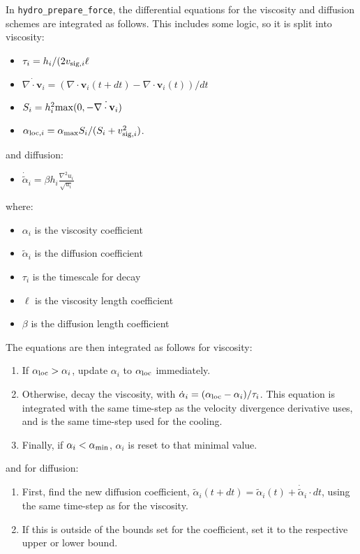 In {\tt hydro\_prepare\_force}, the differential equations for the viscosity and
diffusion schemes are integrated as follows. This includes some logic, so it is
split into viscosity:
\begin{itemize}
	\item $\tau_i = h_i / (2 v_{{\rm sig}, i} \ell$
	\item $\dot{\nabla \cdot \mathbf{v}_i} =
	       \left({\nabla \cdot \mathbf{v}_i}(t+dt) - {\nabla \cdot \mathbf{v}_i}(t)\right)
	       / dt$
	\item $S_i = h_i^2 {\rm max}(0, -\dot{\nabla \cdot \mathbf{v}_i})$
	\item $\alpha_{{\rm loc}, i} = \alpha_{\rm max} S_i / (S_i + v_{{\rm sig}, i}^2)$.
\end{itemize}
and diffusion:
\begin{itemize}
	\item $\dot{\tilde{\alpha}}_i = \beta h_i \frac{\nabla^2 u_i}{\sqrt{u_i}}$
\end{itemize}
where:
\begin{itemize}
	\item $\alpha_i$ is the viscosity coefficient
	\item $\tilde{\alpha}_i$ is the diffusion coefficient
	\item $\tau_i$ is the timescale for decay
	\item $\ell$ is the viscosity length coefficient
	\item $\beta$ is the diffusion length coefficient
\end{itemize}
The equations are then integrated as follows for viscosity:
\begin{enumerate}
	\item If $\alpha_{\rm loc} > \alpha_i$, update $\alpha_i$ to $\alpha_{\rm loc}$
	      immediately.
	\item Otherwise, decay the viscosity, with $\dot{\alpha}_i = (\alpha_{\rm loc} - \alpha_i) / \tau_i$.
	      This equation is integrated with the same time-step as the velocity divergence derivative
	      uses, and is the same time-step used for the cooling.
	\item Finally, if $\alpha_i < \alpha_{\rm min}$, $\alpha_i$ is reset to that minimal
	      value.
\end{enumerate}
and for diffusion:
\begin{enumerate}
	\item First, find the new diffusion coefficient, $\tilde{\alpha}_i(t+dt) = 
	      \tilde{\alpha}_i(t) + \dot{\tilde{\alpha}}_i \cdot dt$, using the
	      same time-step as for the viscosity.
	\item If this is outside of the bounds set for the coefficient, set it
	      to the respective upper or lower bound.
\end{enumerate}
